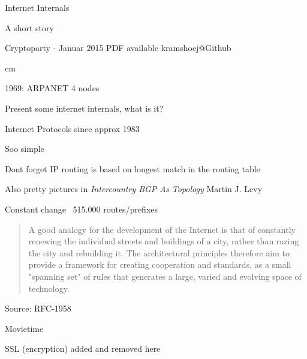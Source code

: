\documentclass[20pt,landscape,a4paper,footrule]{foils}
\begin{document}


\mytitlepage
{Internet Internals

A short story}


\centerline{\footnotesize Cryptoparty - Januar 2015
 PDF available kramshoej@Github}

\LogoOn



 cm


\centerline{1969: ARPANET 4 nodes}


\begin{list1}
\item Present some internet internals, what is it?
\end{list1}


\vskip 1cm
\centerline{Internet Protocols since approx 1983}



\centerline{Soo simple \smiley}

Dont forget IP routing is based on longest match in the routing table



Also pretty pictures in \emph{Intercountry BGP As Topology} Martin J. Levy\\




\vskip 1cm
\centerline{Constant change ~515.000 routes/prefixes}

\begin{quote}
 A good analogy for the development of the Internet is that of
 constantly renewing the individual streets and buildings of a city,
 rather than razing the city and rebuilding it. The architectural
 principles therefore aim to provide a framework for creating
 cooperation and standards, as a small "spanning set" of rules that
 generates a large, varied and evolving space of technology.
\end{quote}
Source: RFC-1958

Movietime



\centerline{SSL (encryption) added and removed here}



\myquestionspage
\end{document}
